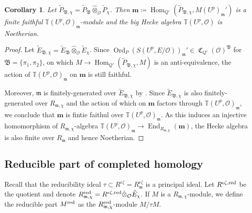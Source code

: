 \documentclass[leqno]{amsart}
\newtheorem{cor}[thm]{Corollary}
\theoremstyle{definition}
\theoremstyle{remark}
\newcommand{\oo}{\mathcal{O}}
\DeclareMathOperator{\End}{End}
\DeclareMathOperator{\Hom}{Hom}
\newcommand{\fm}{\mathfrak{m}}
\DeclareMathOperator{\fC}{\mathfrak{C}} %
\DeclareMathOperator{\Ord}{Ord} %
\newcommand{\B}{\mathfrak B} %
\newcommand{\red}{\textnormal{red}}
\newcommand{\TT}{\mathbb{T}} %
\begin{document}
\begin{cor}\label{cor:Hecke_Noetherian}
	Let $\tilde{P}_{\B,\chi}
	=\tilde{P}_\B\hat{\otimes}_{\oo}\tilde{P}_\chi$.
	Then $\mathbf{m}\coloneqq
	\Hom_{Q'}(\tilde{P}_{\B,\chi},M(U^p)_{\fm}')$
	is a finite faithful $\TT(U^p,\oo)_{\fm}$-module
	and the big Hecke algebra
	$\TT(U^p,\oo)$ is Noetherian.
\end{cor}
\begin{proof}
	Let $\tilde{E}_{\B,\chi}
	=\tilde{E}_\B\hat{\otimes}_{\oo}\tilde{E}_\chi$.
	Since $\Ord_P(S(U^p,E/\oo))_\fm'
	\in \fC_{Q'}(\oo)^{\B}$
	for $\B=\{\pi_1,\pi_2\}$,
	on which $M\to \Hom_{Q'}(\tilde{P}_{\B,\chi},M)$
	is an anti-equivalence,
	the action of $\TT(U^p,\oo)_\fm$
	on $\mathbf{m}$ is still faithful.

	Moreover, $\fm$ is finitely-generated
	over  $ \tilde{E}_{\B,\chi}$
	by \cite[Prop 4.17]{pask}.
	Since $ \tilde{E}_{\B,\chi}$
	is also finitely-generated
	over $R_{\fm,\chi}$
	and the action of which on $\mathbf{m}$
	factors through $\TT(U^p,\oo)_{\fm}$,
	we conclude that $\mathbf{m}$ 
	is fintie faithul over $\TT(U^p,\oo)_{\fm}$.
	As this induces an injective homomorphism
	of $R_{\fm,\chi}$-algebra
	$\TT(U^p,\oo)_{\fm}\to 
	\End_{R_{\fm,\chi}}(\mathbf{m})$,
	the Hecke algebra
	is also finite over $R_{\fm}$ and hence Noetherian.
\end{proof}


\subsection{Reducible part of completed homology}

Recall that the reducibility ideal 
$\tau\subset R^{\epsilon\zeta}=R^{\epsilon\zeta}_{\fm}$
is a principal ideal.
Let $R^{\epsilon\zeta,\red}$ be the quotient 
and denote $R_{\fm,\chi}^{\red}=R^{\epsilon\zeta,\red}
\hat{\otimes}_{\oo}\tilde{E}_\chi$.
If $M$ is a  $R_{\fm,\chi}$-module,
we define the reducible part $M^{\red}$ 
as the $R_{\fm,\chi}^{\red}$-module
$M/\tau M$.
\end{document}
